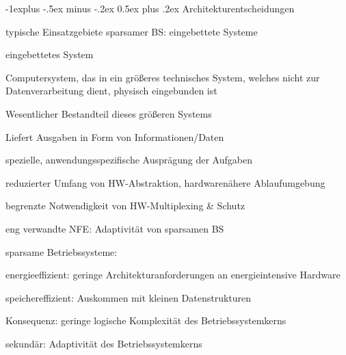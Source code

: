 \documentclass[a4paper]{article}
\makeatletter
\renewcommand{\subsection}{\@startsection{subsection}{2}{0mm}%
 {-1explus -.5ex minus -.2ex}%
 {0.5ex plus .2ex}%
 {\normalfont\normalsize\bfseries}}
\makeatother
\begin{document}
\begin{multicols}{3}
    \subsection{Architekturentscheidungen}
    \begin{itemize*}
        \item typische Einsatzgebiete sparsamer BS: eingebettete Systeme
        \item eingebettetes System
        \begin{itemize*}
            \item Computersystem, das in ein größeres technisches System, welches nicht zur Datenverarbeitung dient, physisch eingebunden ist
            \item Wesentlicher Bestandteil dieses größeren Systems
            \item Liefert Ausgaben in Form von Informationen/Daten
        \end{itemize*}
        \item spezielle, anwendungsspezifische Ausprägung der Aufgaben
        \begin{itemize*}
            \item reduzierter Umfang von HW-Abstraktion, hardwarenähere Ablaufumgebung
            \item begrenzte Notwendigkeit von HW-Multiplexing \& Schutz
        \end{itemize*}
        \item eng verwandte NFE: Adaptivität von sparsamen BS
        \item sparsame Betriebssysteme:
        \begin{itemize*}
            \item energieeffizient: geringe Architekturanforderungen an energieintensive Hardware
            \item speichereffizient: Auskommen mit kleinen Datenstrukturen
        \end{itemize*}
        \item Konsequenz: geringe logische Komplexität des Betriebssystemkerns
        \item sekundär: Adaptivität des Betriebssystemkerns
    \end{itemize*}


\end{multicols}
\end{document}
